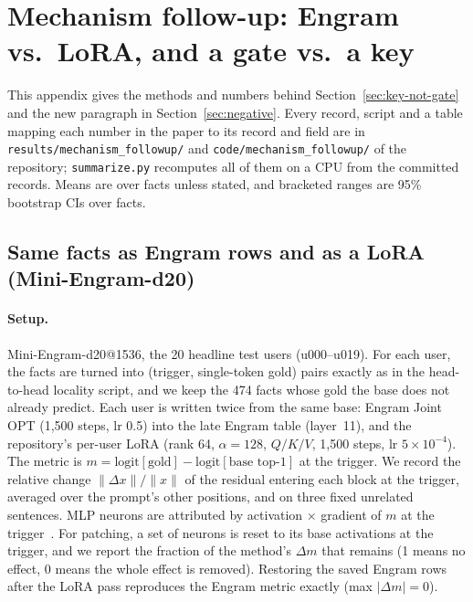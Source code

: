 \documentclass[11pt]{article}
\begin{document}
\section{Mechanism follow-up: Engram vs.\ LoRA, and a gate vs.\ a key}
\label{app:followup}

This appendix gives the methods and numbers behind
Section~\ref{sec:key-not-gate} and the new paragraph in
Section~\ref{sec:negative}. Every record, script and a table mapping
each number in the paper to its record and field are in
\texttt{results/mechanism\_followup/} and
\texttt{code/mechanism\_followup/} of the repository;
\texttt{summarize.py} recomputes all of them on a CPU from the committed
records. Means are over facts unless stated, and bracketed ranges are
95\% bootstrap CIs over facts.

\subsection{Same facts as Engram rows and as a LoRA (Mini-Engram-d20)}
\label{app:followup-engram}

\paragraph{Setup.} Mini-Engram-d20@1536, the 20 headline test users
(u000--u019). For each user, the facts are turned into
(trigger, single-token gold) pairs exactly as in the head-to-head
locality script, and we keep the 474 facts whose gold the base does
not already predict. Each user is written twice from the same base:
Engram Joint OPT (1{,}500 steps, lr 0.5) into the late Engram table
(layer~11), and the repository's per-user LoRA (rank 64, $\alpha=128$,
$Q/K/V$, 1{,}500 steps, lr $5\times10^{-4}$). The metric is
$m=\text{logit}[\text{gold}]-\text{logit}[\text{base top-1}]$ at the
trigger. We record the relative change $\|\Delta x\|/\|x\|$ of the
residual entering each block at the trigger, averaged over the prompt's
other positions, and on three fixed unrelated sentences. MLP neurons
are attributed by activation $\times$ gradient of $m$ at the
trigger~\citep{kramar2024atp}. For patching, a set of neurons is reset
to its base activations at the trigger, and we report the fraction of
the method's $\Delta m$ that remains (1 means no effect, 0 means the
whole effect is removed). Restoring the saved Engram rows after the LoRA
pass reproduces the Engram metric exactly (max $|\Delta m|=0$).
\end{document}

